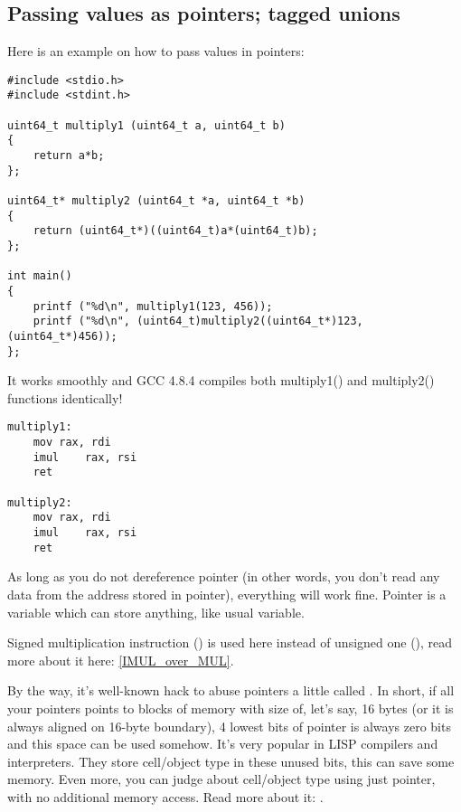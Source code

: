 \subsection{Passing values as pointers; tagged unions}

Here is an example on how to pass values in pointers:

\begin{lstlisting}[label=unsigned_multiply_C,style=customc]
#include <stdio.h>
#include <stdint.h>

uint64_t multiply1 (uint64_t a, uint64_t b)
{
	return a*b;
};

uint64_t* multiply2 (uint64_t *a, uint64_t *b)
{
	return (uint64_t*)((uint64_t)a*(uint64_t)b);
};

int main()
{
	printf ("%d\n", multiply1(123, 456));
	printf ("%d\n", (uint64_t)multiply2((uint64_t*)123, (uint64_t*)456));
};
\end{lstlisting}

It works smoothly and GCC 4.8.4 compiles both multiply1() and multiply2() functions identically!

\begin{lstlisting}[label=unsigned_multiply_lst,style=customasmx86]
multiply1:
	mov	rax, rdi
	imul	rax, rsi
	ret

multiply2:
	mov	rax, rdi
	imul	rax, rsi
	ret
\end{lstlisting}

As long as you do not dereference pointer (in other words, you don't read any data from the address stored in pointer), everything will work fine.
Pointer is a variable which can store anything, like usual variable.

Signed multiplication instruction (\IMUL) is used here instead of unsigned one (\MUL), read more about it here:
\ref{IMUL_over_MUL}.

By the way, it's well-known hack to abuse pointers a little called .
In short, if all your pointers points to blocks of memory with size of, let's say, 16 bytes (or it is always aligned on 16-byte boundary), 4 lowest bits of pointer is always zero bits and this space
can be used somehow.
It's very popular in LISP compilers and interpreters.
They store cell/object type in these unused bits, this can save some memory.
Even more, you can judge about cell/object type using just pointer, with no additional memory access.
Read more about it: .


